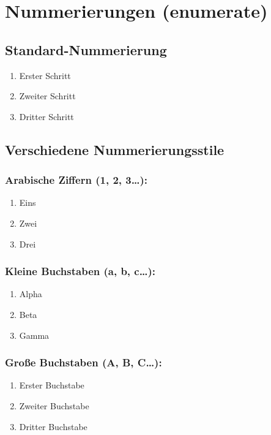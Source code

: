 \chapter{Nummerierungen (enumerate)}
\label{sec:enumerate}

\section{Standard-Nummerierung}

\begin{enumerate}
    \item Erster Schritt
    \item Zweiter Schritt
    \item Dritter Schritt
\end{enumerate}

\section{Verschiedene Nummerierungsstile}

\subsection{Arabische Ziffern (1, 2, 3\ldots):}
\begin{enumerate}[label=\arabic*.]
    \item Eins
    \item Zwei
    \item Drei
\end{enumerate}

\subsection{Kleine Buchstaben (a, b, c\ldots):}
\begin{enumerate}[label=\alph*.]
    \item Alpha
    \item Beta
    \item Gamma
\end{enumerate}

\subsection{Große Buchstaben (A, B, C\ldots):}
\begin{enumerate}[label=\Alph*.]
    \item Erster Buchstabe
    \item Zweiter Buchstabe
    \item Dritter Buchstabe
\end{enumerate}

